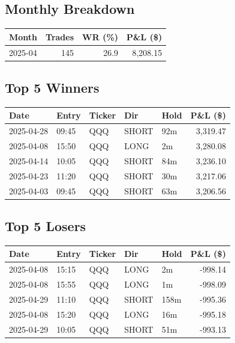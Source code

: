 \documentclass[11pt,a4paper,twoside]{article}
\begin{document}
\subsection{Monthly Breakdown}
\noindent\begin{center}
\begin{tabular}{>{\color{txtmain}}l rrr}
\toprule
\rowcolor{cardbg}
\textbf{Month} & \textbf{Trades} & \textbf{WR (\%)} & \textbf{P\&L (\$)} \\
\midrule
2025-04 & 145 & 26.9 & \textcolor{wingreen}{8,208.15} \\
\bottomrule
\end{tabular}
\end{center}
\subsection{Top 5 Winners}
\noindent\begin{center}
\begin{tabular}{>{\color{txtmain}}l llll r}
\toprule
\rowcolor{cardbg}
\textbf{Date} & \textbf{Entry} & \textbf{Ticker} & \textbf{Dir} & \textbf{Hold} & \textbf{P\&L (\$)} \\
\midrule
2025-04-28 & 09:45 & QQQ & SHORT & 92m & \textcolor{wingreen}{3,319.47} \\
2025-04-08 & 15:50 & QQQ & LONG & 2m & \textcolor{wingreen}{3,280.08} \\
2025-04-14 & 10:05 & QQQ & SHORT & 84m & \textcolor{wingreen}{3,236.10} \\
2025-04-23 & 11:20 & QQQ & SHORT & 30m & \textcolor{wingreen}{3,217.06} \\
2025-04-03 & 09:45 & QQQ & SHORT & 63m & \textcolor{wingreen}{3,206.56} \\
\bottomrule
\end{tabular}
\end{center}
\subsection{Top 5 Losers}
\noindent\begin{center}
\begin{tabular}{>{\color{txtmain}}l llll r}
\toprule
\rowcolor{cardbg}
\textbf{Date} & \textbf{Entry} & \textbf{Ticker} & \textbf{Dir} & \textbf{Hold} & \textbf{P\&L (\$)} \\
\midrule
2025-04-08 & 15:15 & QQQ & LONG & 2m & \textcolor{lossred}{-998.14} \\
2025-04-08 & 15:55 & QQQ & LONG & 1m & \textcolor{lossred}{-998.09} \\
2025-04-29 & 11:10 & QQQ & SHORT & 158m & \textcolor{lossred}{-995.36} \\
2025-04-08 & 15:20 & QQQ & LONG & 16m & \textcolor{lossred}{-995.18} \\
2025-04-29 & 10:05 & QQQ & SHORT & 51m & \textcolor{lossred}{-993.13} \\
\bottomrule
\end{tabular}
\end{center}
\clearpage
\end{document}
